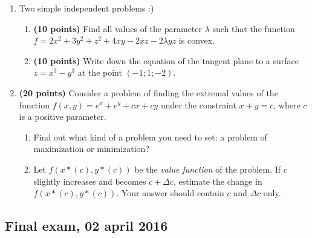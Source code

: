 \begin{enumerate}[resume]

\item Two simple independent problems :)
\begin{enumerate}
\item \textbf{(10 points) }Find all values of the parameter $\lambda $ such that the function $f=2x^{2} +3y^{2} +z^{2} +4xy-2xz-2\lambda yz$ is convex.

\item \textbf{(10 points) }Write down the equation of the tangent plane to a surface $z=x^{3} -y^{3} $ at the point $(-1;1;-2)$.
\end{enumerate}

\item \textbf{(20 points) }Consider a problem of finding the extremal values of the function $f(x,y)=e^{x} +e^{y} +cx+cy$ under the constraint $x+y=c$, where $c$ is a positive parameter.

\begin{enumerate}
\item  Find out what kind of a problem you need to set: a problem of maximization or minimization?

\item Let $f(x*(c),y*(c))$ be the \textit{value function} of the problem. If $c$ slightly increases and becomes $c+\Delta c$, estimate the change in $f(x*(c),y*(c))$. Your answer should contain $c$ and $\Delta c$ only.
\end{enumerate}

\end{enumerate}


\subsection{Final exam, 02 april 2016}

